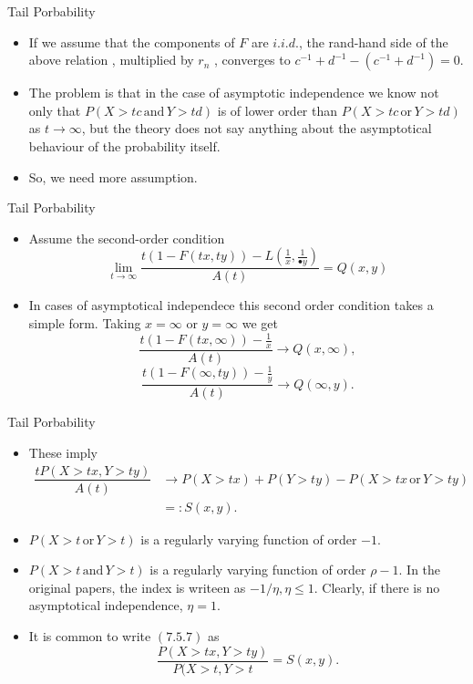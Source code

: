 \documentclass[11pt]{beamer}
\begin{document}
\begin{frame}{Tail Porbability}
\begin{itemize}
\item  If we assume that the components of $F$ are $i.i.d.$, the rand-hand side of the above relation , multiplied by $r_n$ , converges to $c^{-1}+d^{-1}-(c^{-1}+d^{-1})=0$. 
\item The problem is that in the case of asymptotic independence we know not only that $P(X>tc \,\text{and}\, Y>td)$ is of lower order than $P(X>tc \, \text{or}\, Y>td)$ as $t\to \infty$, but the theory does not say anything about the asymptotical behaviour of the probability itself.
\item So, we need more assumption.
\end{itemize}
\end{frame}
\begin{frame}{Tail Porbability}
\begin{itemize}
 \item Assume the second-order condition
 \begin{displaymath}
 \lim_{t\to \infty} \dfrac{t(1-F(tx,ty))-L(\frac{1}{x},\frac{1}{•y})}{A(t)}=Q(x,y)
 \end{displaymath}
\item In cases of asymptotical independece this second order condition takes a simple form. Taking $x=\infty$ or $y=\infty$ we get
\begin{displaymath}
 \dfrac{t(1-F(tx,\infty))-\frac{1}{x}}{A(t)}\to Q(x,\infty),
\end{displaymath} 
 \begin{displaymath}
 \dfrac{t(1-F(\infty,ty))-\frac{1}{y}}{A(t)}\to Q(\infty,y).
\end{displaymath} 
\end{itemize}
\end{frame}
\begin{frame}{Tail Porbability}
\begin{itemize}
\item These imply
\begin{equation} 
\begin{split}
\dfrac{tP(X>tx, Y>ty)}{A(t)} &\to P(X>tx)+P(Y>ty)-P(X>tx\, \text{or}\, Y>ty)\\
 &=:S(x,y).      
\end{split} \tag{7.5.7}
\end{equation}
\item $P(X>t\, \text{or}\, Y>t)$ is  a regularly varying function of order $-1$.
\item  $P(X>t\, \text{and}\, Y>t)$ is  a regularly varying function of order $\rho-1.$ In the original papers, the index is writeen as $-1/\eta, \eta\le 1$. Clearly, if there is no asymptotical independence, $\eta=1$.
\item It is common to write $(7.5.7)$ as 
\begin{displaymath}
\dfrac{P(X>tx, Y>ty)}{P(X>t, Y>t}=S(x,y).
\end{displaymath}
\end{itemize}
\end{frame}
\end{document}
